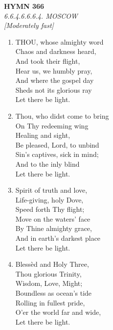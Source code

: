 \newpage
\begin{center}
    {\Large \textbf{HYMN 366}}
    \\
    \textit{6.6.4.6.6.6.4. MOSCOW}
    \\
    \textit{\small [Moderately fast]}
\end{center}
\vspace{1em}

\begin{enumerate}
    \item THOU, whose almighty word \\
        Chaos and darkness heard, \\
        And took their flight, \\
        Hear us, we humbly pray, \\
        And where the gospel day \\
        Sheds not its glorious ray \\
        Let there be light.

    \item Thou, who didst come to bring \\
        On Thy redeeming wing \\
        Healing and sight, \\
        Be pleased, Lord, to unbind \\
        Sin's captives, sick in mind; \\
        And to the inly blind \\
        Let there be light.

    \item Spirit of truth and love, \\
        Life-giving, holy Dove, \\
        Speed forth Thy flight; \\
        Move on the waters' face \\
        By Thine almighty grace, \\
        And in earth's darkest place \\
        Let there be light.

    \item Bless\`ed and Holy Three, \\
        Thou glorious Trinity, \\
        Wisdom, Love, Might; \\
        Boundless as ocean's tide \\
        Rolling in fullest pride, \\
        O'er the world far and wide, \\
        Let there be light.

\end{enumerate}

